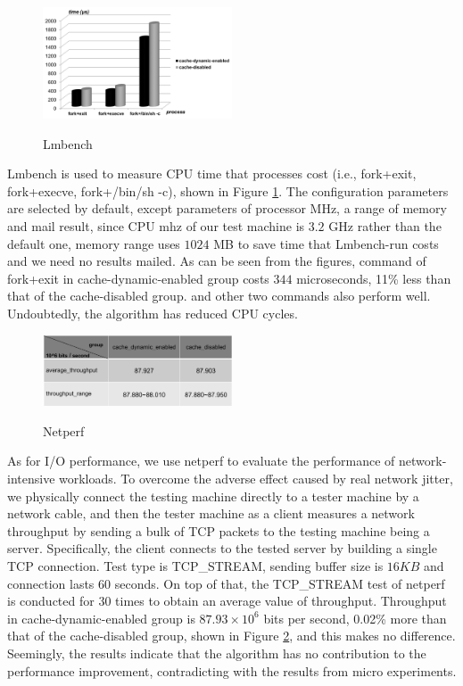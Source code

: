 \begin{figure}[ht]
\centering
\includegraphics[width=0.5\textwidth]{image/macro/lmbench.png} \\
\caption{Lmbench}
\label{fig:lmbench}
\end{figure}

Lmbench is used to measure CPU time that processes cost (i.e., fork+exit, fork+execve, fork+/bin/sh -c), shown in Figure \ref{fig:lmbench}. The configuration parameters are selected by default, except parameters of processor MHz, a range of memory and mail result, since CPU mhz of our test machine is $3.2$ GHz rather than the default one, memory range uses $1024$ MB to save time that Lmbench-run costs and we need no results mailed. As can be seen from the figures, command of fork+exit in cache-dynamic-enabled group costs $344$ microseconds, 11\% less than that of the cache-disabled group. and other two commands also perform well. Undoubtedly, the algorithm has reduced CPU cycles.


\begin{figure}[ht]
\centering
\includegraphics[width=0.5\textwidth]{image/macro/netperf.png} \\
\caption{Netperf}
\label{fig:netperf}
\end{figure}


As for I/O performance, we use netperf to evaluate the performance of network-intensive workloads. To overcome the adverse effect caused by real network jitter, we physically connect the testing machine directly to a tester machine by a network cable, and then the tester machine as a client measures a network throughput by sending a bulk of TCP packets to the testing machine being a server. Specifically, the client connects to the tested server by building a single TCP connection. Test type is TCP\_STREAM, sending buffer size is $16KB$ and connection lasts $60$ seconds. On top of that, the TCP\_STREAM test of netperf is conducted for $30$ times to obtain an average value of throughput. Throughput in cache-dynamic-enabled group is $87.93 \times 10^6$ bits per second, 0.02\% more than that of the cache-disabled group, shown in Figure \ref{fig:netperf}, and this makes no difference.
Seemingly, the results indicate that the algorithm has no contribution to the performance improvement, contradicting with the results from micro experiments.

